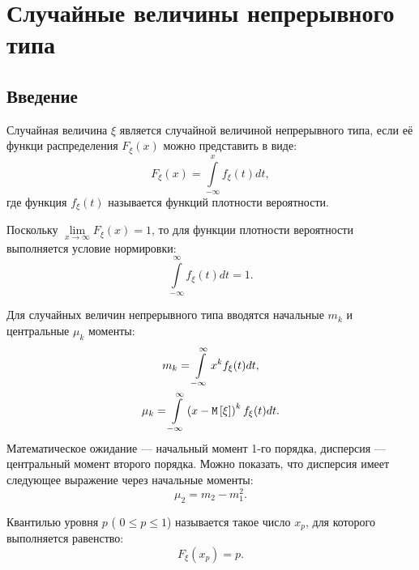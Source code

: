 \chapter{Случайные величины непрерывного типа}

\section*{Введение}

Случайная величина $\xi$ является случайной величиной непрерывного типа, если её функци распределения $F_\xi(x)$ можно представить в виде:
\begin{equation}
    F_{\xi}(x) = \int \limits_{-\infty}^x f_\xi(t) dt ,
\end{equation}
где функция $f_\xi(t)$ называется функций плотности вероятности.

Поскольку $\lim \limits_{x \rightarrow \infty} F_\xi(x) = 1$, то для функции плотности вероятности выполняется условие нормировки:
\begin{equation}
    \int \limits_{-\infty}^\infty f_\xi(t) dt = 1 .
\end{equation}

Для случайных величин непрерывного типа вводятся начальные $m_k$ и центральные $\mu_k$ моменты:
\begin{gather}
    m_k = \int \limits_{-\infty}^\infty x^k f_\xi(t) dt, \\
    \mu_k = \int \limits_{-\infty}^\infty \left ( x - \mathtt{M} \left [ \xi \right ] \right )^k f_\xi(t) dt.
\end{gather}
Математическое ожидание --- начальный момент 1-го порядка, дисперсия --- центральный момент второго порядка. Можно показать, что дисперсия имеет следующее выражение через
начальные моменты:
\begin{equation}
    \mu_2 = m_2 - m_1^2 .
\end{equation}

Квантилью уровня $p$ ( $0 \le p \le 1$) называется такое число $x_p$, для которого выполняется равенство:
\begin{equation}
    F_{\xi}(x_p) = p .
\end{equation}

